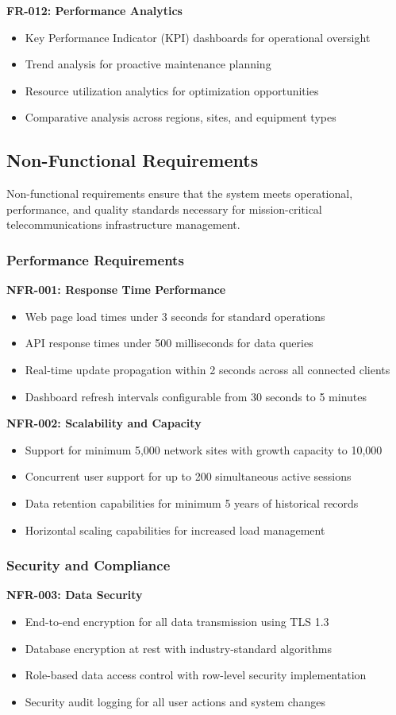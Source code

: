 \textbf{FR-012: Performance Analytics}
\begin{itemize}
\item Key Performance Indicator (KPI) dashboards for operational oversight
\item Trend analysis for proactive maintenance planning
\item Resource utilization analytics for optimization opportunities
\item Comparative analysis across regions, sites, and equipment types
\end{itemize}

\subsection{Non-Functional Requirements}

Non-functional requirements ensure that the system meets operational, performance, and quality standards necessary for mission-critical telecommunications infrastructure management.

\subsubsection{Performance Requirements}
\textbf{NFR-001: Response Time Performance}
\begin{itemize}
\item Web page load times under 3 seconds for standard operations
\item API response times under 500 milliseconds for data queries
\item Real-time update propagation within 2 seconds across all connected clients
\item Dashboard refresh intervals configurable from 30 seconds to 5 minutes
\end{itemize}

\textbf{NFR-002: Scalability and Capacity}
\begin{itemize}
\item Support for minimum 5,000 network sites with growth capacity to 10,000
\item Concurrent user support for up to 200 simultaneous active sessions
\item Data retention capabilities for minimum 5 years of historical records
\item Horizontal scaling capabilities for increased load management
\end{itemize}

\subsubsection{Security and Compliance}
\textbf{NFR-003: Data Security}
\begin{itemize}
\item End-to-end encryption for all data transmission using TLS 1.3
\item Database encryption at rest with industry-standard algorithms
\item Role-based data access control with row-level security implementation
\item Security audit logging for all user actions and system changes
\end{itemize}

